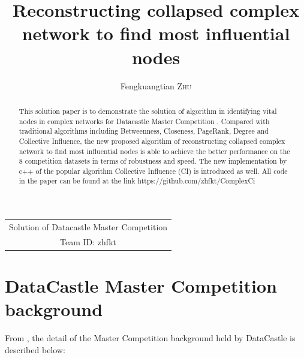 \documentclass{article}
\title{ Reconstructing collapsed complex network to find most influential nodes  } %
\author{Fengkuangtian \textsc{Zhu}} %
\begin{document}
	
	\maketitle %
	
	
	
	\begin{center}
		\begin{tabular}{c}
			Solution of Datacastle Master Competition	\\
			Team ID: zhfkt 
		\end{tabular}
	\end{center}
	
	\begin{abstract}
		This solution paper is to demonstrate the solution of algorithm in identifying vital nodes in complex networks for Datacastle Master Competition . Compared with traditional algorithms including Betweenness\cite{wikiBetweennesscentrality}, Closeness\cite{wikiClosenesscentrality}, PageRank\cite{wikiPageRank}, Degree\cite{wikiCentrality} and Collective Influence\cite{morone2015influence}\cite{morone2016collective}, the new proposed algorithm of reconstructing collapsed complex network to find most influential nodes is able to achieve the better performance on the 8 competition datasets in terms of robustness\cite{schneider2011mitigation} and speed. The new implementation by c++ of the popular algorithm Collective Influence (CI) is introduced as well. All code in the paper can be found at the link https://github.com/zhfkt/ComplexCi \cite{zhfktgithub} \cite{zhfkt2017887989}
	\end{abstract}
	
	
	\section{DataCastle Master Competition background}
	
	From \cite{masterCompetitionbackground} , the detail of the Master Competition background held by DataCastle is described below:
	
\end{document}
